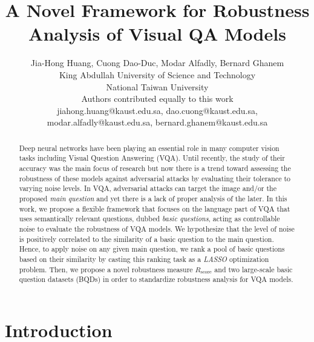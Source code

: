 \documentclass[letterpaper]{article}
\title{A Novel Framework for Robustness Analysis of Visual QA Models}
\author{
  Jia-Hong Huang\up{1,2}, Cuong Dao-Duc\up{1*}, Modar Alfadly\up{1*}, Bernard Ghanem\up{1}\\
  \up{1}King Abdullah University of Science and Technology\\
  \up{2}National Taiwan University\\
  \up{*}Authors contributed equally to this work\\
  jiahong.huang@kaust.edu.sa, dao.cuong@kaust.edu.sa, modar.alfadly@kaust.edu.sa, bernard.ghanem@kaust.edu.sa\\
}
\newcommand{\lasso}{}\def\lasso/{\textit{LASSO}}
\newcommand{\rscore}{}\def\rscore/{$R_{\text{score}}$}
\begin{document}
\maketitle
\begin{abstract}
	Deep neural networks have been playing an essential role in many computer vision tasks including Visual Question Answering (VQA). Until recently, the study of their accuracy was the main focus of research but now there is a trend toward assessing the robustness of these models against adversarial attacks by evaluating their tolerance to varying noise levels. In VQA, adversarial attacks can target the image and/or the proposed \emph{main question} and yet there is a lack of proper analysis of the later. In this work, we propose a flexible framework that focuses on the language part of VQA that uses semantically relevant questions, dubbed \emph{basic questions}, acting as controllable noise to evaluate the robustness of VQA models. We hypothesize that the level of noise is positively correlated to the similarity of a basic question to the main question. Hence, to apply noise on any given main question, we rank a pool of basic questions based on their similarity by casting this ranking task as a \lasso/ optimization problem. Then, we propose a novel robustness measure \rscore/ and two large-scale basic question datasets (BQDs) in order to standardize robustness analysis for VQA models.
\end{abstract}

\section{Introduction}
\end{document}
